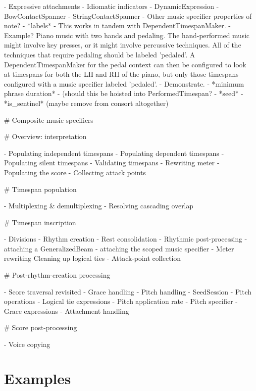 \begin{markdown}
    -   Expressive attachments
        -   Idiomatic indicators
        -   DynamicExpression
        -   BowContactSpanner
        -   StringContactSpanner
-   Other music specifier properties of note?
    -   *labels*
        -   This works in tandem with DependentTimespanMaker.
        -   Example? Piano music with two hands and pedaling. The
            hand-performed music might involve key presses, or it might involve
            percussive techniques. All of the techniques that require pedaling
            should be labeled 'pedaled'. A DependentTimespanMaker for the pedal
            context can then be configured to look at timespans for both the LH
            and RH of the piano, but only those timespans configured with a
            music specifier labeled 'pedaled'.
        -   Demonstrate.
    -   *minimum phrase duration*
        -   (should this be hoisted into PerformedTimespan?
    -   *seed*
    -   *is_sentinel* (maybe remove from consort altogether)

# Composite music specifiers

# Overview: interpretation

-   Populating independent timespans
-   Populating dependent timespans
-   Populating silent timespans
-   Validating timespans
-   Rewriting meter
-   Populating the score
-   Collecting attack points

# Timespan population

-   Multiplexing & demultiplexing
-   Resolving cascading overlap

# Timespan inscription

-   Divisions
-   Rhythm creation
-   Rest consolidation
-   Rhythmic post-processing
    -   attaching a GeneralizedBeam
    -   attaching the scoped music specifier
-   Meter rewriting
    Cleaning up logical ties
-   Attack-point collection

# Post-rhythm-creation processing

-   Score traversal revisited
-   Grace handling
-   Pitch handling
    -   SeedSession
    -   Pitch operations
    -   Logical tie expressions
    -   Pitch application rate
    -   Pitch specifier
    -   Grace expressions
-   Attachment handling

# Score post-processing

-   Voice copying

\end{markdown}

\section{Examples}


